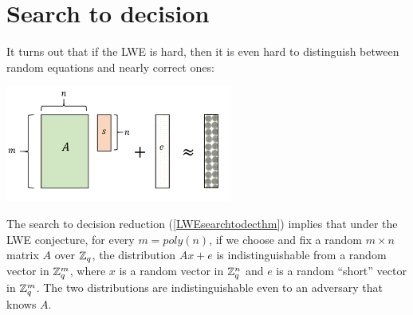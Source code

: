 \section{Search to decision}\label{12-Search-to-decision}

It turns out that if the LWE is hard, then it is even hard to
distinguish between random equations and nearly correct ones:

\begin{marginfigure}
\centering
\includegraphics[width=\linewidth, height=1.5in, keepaspectratio]{../figure/lwevecindist.png}
\caption{The search to decision reduction (\cref{LWEsearchtodecthm})
implies that under the LWE conjecture, for every \(m=poly(n)\), if we
choose and fix a random \(m\times n\) matrix \(A\) over \({\mathbb{Z}}_q\), the
distribution \(Ax+e\) is indistinguishable from a random vector in
\({\mathbb{Z}}_q^m\), where \(x\) is a random vector in \({\mathbb{Z}}_q^n\) and \(e\) is a
random ``short'' vector in \({\mathbb{Z}}_q^m\). The two distributions are
indistinguishable even to an adversary that knows \(A\).}
\label{figid}
\end{marginfigure}

\hypertarget{LWEsearchtodecthm}{}

